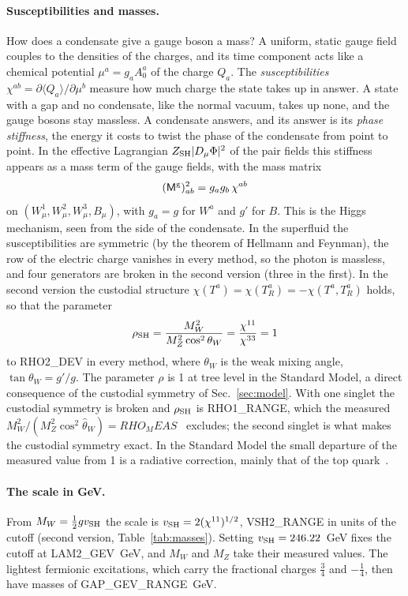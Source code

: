 \documentclass[aps,prd,twocolumn,superscriptaddress,nofootinbib,floatfix,longbibliography]{revtex4-2}
\newcommand{\SH}{{\rm SH}}
\begin{document}
\paragraph*{Susceptibilities and masses.}
How does a condensate give a gauge boson a mass? A uniform, static gauge field couples to the densities of the charges,
and its time component acts like a chemical potential $\mu^a=g_aA^a_0$ of the charge $Q_a$. The \emph{susceptibilities}
$\chi^{ab}=\partial\langle Q_a\rangle/\partial\mu^b$ measure how much charge the state takes up in answer. A state with a
gap and no condensate, like the normal vacuum, takes up none, and the gauge bosons stay massless. A condensate answers,
and its answer is its \emph{phase stiffness}, the energy it costs to twist the phase of the condensate from point to
point. In the effective Lagrangian $Z_\SH|D_\mu\Phi|^2$ of the pair fields this stiffness appears as a mass term of the
gauge fields, with the mass matrix
\begin{equation}
(\mathsf M^{\rm g})^2_{ab}=g_ag_b\,\chi^{ab}
\label{eq:Mg}
\end{equation}
on $(W^1_\mu,W^2_\mu,W^3_\mu,B_\mu)$, with $g_a=g$ for $W^a$ and $g'$ for $B$. This is the Higgs mechanism, seen from the
side of the condensate. In the superfluid the susceptibilities are symmetric (by the theorem of Hellmann and Feynman),
the row of the electric charge vanishes in every method, so the photon is massless, and four generators are broken in
the second version (three in the first). In the second version the custodial structure
$\chi(T^a)=\chi(T^a_R)=-\chi(T^a,T^a_R)$ holds, so that the parameter
\begin{equation}
\rho_\SH=\frac{M_W^2}{M_Z^2\cos^2\theta_W}=\frac{\chi^{11}}{\chi^{33}}=1
\label{eq:rho}
\end{equation}
to {{RHO2_DEV}} in every method, where $\theta_W$ is the weak mixing angle, $\tan\theta_W=g'/g$. The parameter $\rho$ is
1 at tree level in the Standard Model, a direct consequence of the custodial symmetry of Sec.~\ref{sec:model}. With one
singlet the custodial symmetry is broken and $\rho_\SH$ is {{RHO1_RANGE}}, which the measured
$M_W^2/(M_Z^2\cos^2\hat\theta_W)={{RHO_MEAS}}$~\cite{PDG2026} excludes; the second singlet is what makes the custodial
symmetry exact. In the Standard Model the small departure of the measured value from 1 is a radiative correction, mainly
that of the top quark~\cite{Veltman1977}.

\paragraph*{The scale in GeV.}
From $M_W=\frac12gv_\SH$ the scale is $v_\SH=2(\chi^{11})^{1/2}$, {{VSH2_RANGE}} in units of the cutoff (second version,
Table~\ref{tab:masses}). Setting $v_\SH=246.22$~GeV fixes the cutoff at {{LAM2_GEV}}~GeV, and $M_W$ and $M_Z$ take their
measured values. The lightest fermionic excitations, which carry the fractional charges $\frac34$ and $-\frac14$, then
have masses of {{GAP_GEV_RANGE}}~GeV.
\end{document}

